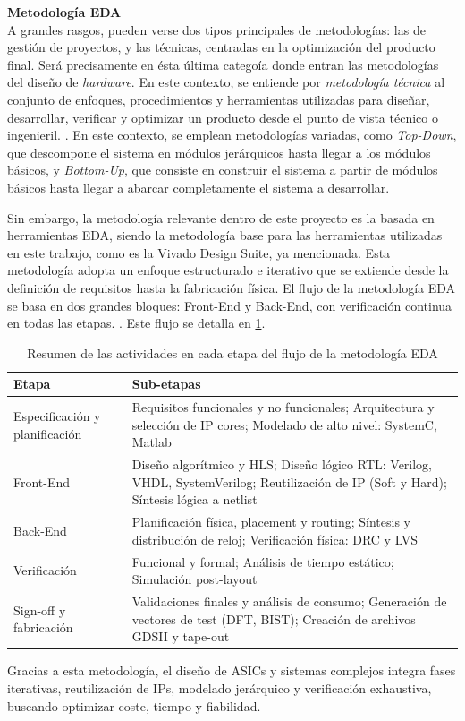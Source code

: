 \begin{adjustwidth}{1.5cm}{}
\textbf{Metodología EDA} \vspace{0.25cm} \\
A grandes rasgos, pueden verse dos tipos principales de metodologías: las de gestión de proyectos, y las técnicas, centradas en la optimización del producto final. Será precisamente en ésta última categoía donde entran las metodologías del diseño de \textit{hardware}. En este contexto, se entiende por \emph{metodología técnica} al conjunto de enfoques, procedimientos y herramientas utilizadas para diseñar, desarrollar, verificar y optimizar un producto desde el punto de vista técnico o ingenieril. \cite{metodologiasHW}. En este contexto, se emplean metodologías variadas, como \textit{Top-Down}, que descompone el sistema en módulos jerárquicos hasta llegar a los módulos básicos, y \textit{Bottom-Up}, que consiste en construir el sistema a partir de módulos básicos hasta llegar a abarcar completamente el sistema a desarrollar. 

Sin embargo, la metodología relevante dentro de este proyecto es la basada en herramientas \ac{EDA}, siendo la metodología base para las herramientas utilizadas en este trabajo, como es la Vivado Design Suite, ya mencionada. Esta metodología adopta un enfoque estructurado e iterativo que se extiende desde la definición de requisitos hasta la fabricación física. El flujo de la metodología EDA se basa en dos grandes bloques: Front-End y Back-End, con verificación continua en todas las etapas. \cite{metodologiaFernando}. Este flujo se detalla en \ref{tbl:flujoEDA}.

\begin{table}[!ht]
\centering
\begin{tabular}{|l|p{9cm}|}
\hline
\textbf{Etapa} & \textbf{Sub-etapas} \\ \hline
Especificación y planificación & Requisitos funcionales y no funcionales; Arquitectura y selección de IP cores; Modelado de alto nivel: SystemC, Matlab \\ \hline
Front-End & Diseño algorítmico y HLS; Diseño lógico RTL: Verilog, VHDL, SystemVerilog; Reutilización de IP (Soft y Hard); Síntesis lógica a netlist \\ \hline
Back-End & Planificación física, placement y routing; Síntesis y distribución de reloj; Verificación física: DRC y LVS \\ \hline
Verificación & Funcional y formal; Análisis de tiempo estático; Simulación post-layout \\ \hline
Sign-off y fabricación & Validaciones finales y análisis de consumo; Generación de vectores de test (DFT, BIST); Creación de archivos GDSII y tape-out \\ \hline
\end{tabular}
\caption{Resumen de las actividades en cada etapa del flujo de la metodología EDA}
\label{tbl:flujoEDA}
\end{table}

Gracias a esta metodología, el diseño de ASICs y sistemas complejos integra fases iterativas, reutilización de IPs, modelado jerárquico y verificación exhaustiva, buscando optimizar coste, tiempo y fiabilidad. 
\end{adjustwidth}

